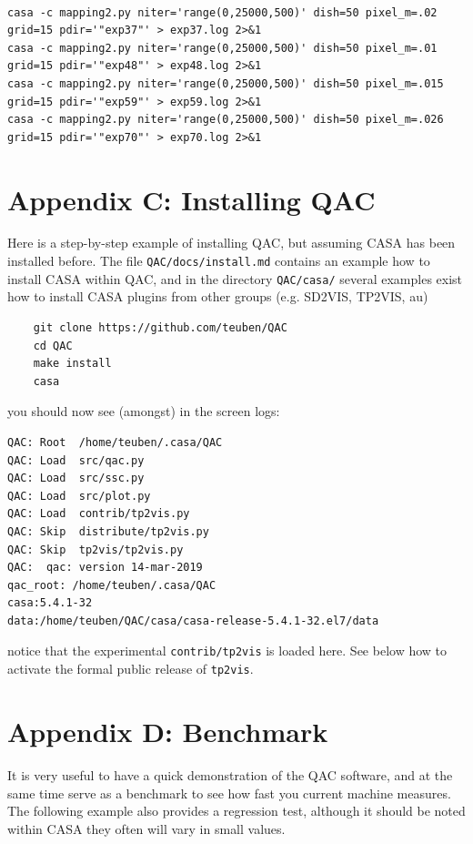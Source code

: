 \documentclass[11pt,twoside]{article}
\begin{document}
\footnotesize
\begin{verbatim}

casa -c mapping2.py niter='range(0,25000,500)' dish=50 pixel_m=.02  grid=15 pdir='"exp37"' > exp37.log 2>&1
casa -c mapping2.py niter='range(0,25000,500)' dish=50 pixel_m=.01  grid=15 pdir='"exp48"' > exp48.log 2>&1
casa -c mapping2.py niter='range(0,25000,500)' dish=50 pixel_m=.015 grid=15 pdir='"exp59"' > exp59.log 2>&1
casa -c mapping2.py niter='range(0,25000,500)' dish=50 pixel_m=.026 grid=15 pdir='"exp70"' > exp70.log 2>&1

\end{verbatim}
\normalsize


\newpage
\section*{Appendix C: Installing QAC}

Here is a step-by-step example of installing QAC, but assuming CASA has been installed before.
The file \verb+QAC/docs/install.md+ contains an example how to install CASA within QAC, and in the
directory \verb+QAC/casa/+ several examples exist how to install CASA plugins from other groups
(e.g. SD2VIS, TP2VIS, au)

\footnotesize
\begin{verbatim}
    git clone https://github.com/teuben/QAC
    cd QAC
    make install
    casa
\end{verbatim}
\normalsize

\noindent
you should now see (amongst) in the screen logs:

\footnotesize
\begin{verbatim}
QAC: Root  /home/teuben/.casa/QAC
QAC: Load  src/qac.py
QAC: Load  src/ssc.py
QAC: Load  src/plot.py
QAC: Load  contrib/tp2vis.py
QAC: Skip  distribute/tp2vis.py
QAC: Skip  tp2vis/tp2vis.py
QAC:  qac: version 14-mar-2019
qac_root: /home/teuben/.casa/QAC
casa:5.4.1-32
data:/home/teuben/QAC/casa/casa-release-5.4.1-32.el7/data
\end{verbatim}
\normalsize

notice that the experimental {\tt contrib/tp2vis} is loaded here. See below how to
activate the formal public release of {\tt tp2vis}.


\newpage
\section*{Appendix D: Benchmark}

It is very useful to have a quick demonstration of the QAC software, and at the same time
serve as a benchmark to see how fast you current machine measures. The following example
also provides a regression test, although it should be noted within CASA they often will
vary in small values.
\end{document}
